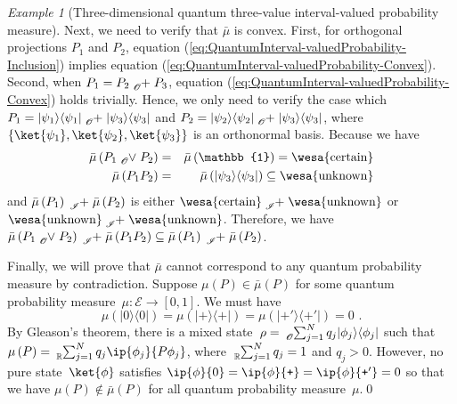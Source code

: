 \documentclass{article}
\theoremstyle{remark}
\newtheorem{example}{Example}
\newcommand{\events}{\ensuremath{\mathcal{E}}}
\newcommand{\proj}[1]{|#1 \rangle\langle #1 |}
\newcommand{\ps}{\texttt{+}}
\newcommand{\necess}{{\mbox{\wesa{certain}}}}
\newcommand{\unknown}{{\mbox{\wesa{unknown}}}}
\begin{document}
\begin{example}[Three-dimensional quantum three-value interval-valued
probability measure]
Next, we need to verify that $\bar{\mu}$ is convex. First, for orthogonal
projections $P_{1}$ and $P_{2}$, equation (\ref{eq:QuantumInterval-valuedProbability-Inclusion})
implies equation (\ref{eq:QuantumInterval-valuedProbability-Convex}).
Second, when $P_{1}=P_{2}\tensor*[_{\mathscr{O}}]{+}{}P_{3}$, equation
(\ref{eq:QuantumInterval-valuedProbability-Convex}) holds trivially.
Hence, we only need to verify the case which $P_{1}=\proj{\psi_{1}}\tensor*[_{\mathscr{O}}]{+}{}\proj{\psi_{3}}$
and $P_{2}=\proj{\psi_{2}}\tensor*[_{\mathscr{O}}]{+}{}\proj{\psi_{3}}$,
where $\left\{ \ket{\psi_{1}},\ket{\psi_{2}},\ket{\psi_{3}}\right\} $
is an orthonormal basis. Because we have 
\begin{eqnarray*}
\bar{\mu}\left(P_{1}\tensor*[_{\mathscr{O}}]{\vee}{}P_{2}\right) & = & \bar{\mu}\left(\mathbb{1}\right)=\necess\\
\bar{\mu}\left(P_{1}P_{2}\right) & = & \bar{\mu}\left(\proj{\psi_{3}}\right)\subseteq\unknown
\end{eqnarray*}
and $\bar{\mu}\left(P_{1}\right)\tensor*[_{\mathscr{I}}]{+}{}\bar{\mu}\left(P_{2}\right)$
is either $\necess\tensor*[_{\mathscr{I}}]{+}{}\unknown$ or $\unknown\tensor*[_{\mathscr{I}}]{+}{}\unknown$.
Therefore, we have $\bar{\mu}\left(P_{1}\tensor*[_{\mathscr{O}}]{\vee}{}P_{2}\right)\tensor*[_{\mathscr{I}}]{+}{}\bar{\mu}\left(P_{1}P_{2}\right)\subseteq\bar{\mu}\left(P_{1}\right)\tensor*[_{\mathscr{I}}]{+}{}\bar{\mu}\left(P_{2}\right)$.

Finally, we will prove that $\bar{\mu}$ cannot correspond to any
quantum probability measure by contradiction. Suppose $\mu(P)\in\bar{\mu}(P)$
for some quantum probability measure~$\mu:\events\rightarrow\left[0,1\right]$.
We must have 
\begin{equation}
\mu(\proj{0})=\mu(\proj{\ps})=\mu(\proj{\ps'})=0\textrm{ .}\label{eq:probability-zero-on-states}
\end{equation}
By Gleason's theorem, there is a mixed state~$\rho=\tensor*[_{\mathscr{O}}]{\sum}{_{j=1}^{N}}q_{j}\proj{\phi_{j}}$
such that $\mu\left(P\right)=\tensor*[_{\mathbb{R}}]{\sum}{_{j=1}^{N}}q_{j}\ip{\phi_{j}}{P\phi_{j}}$,
where $\tensor*[_{\mathbb{R}}]{\sum}{_{j=1}^{N}}q_{j}=1$ and $q_{j}>0$.
However, no pure state~$\ket{\phi}$ satisfies $\ip{\phi}{0}=\ip{\phi}{\ps}=\ip{\phi}{\ps'}=0$
so that we have $\mu(P)\notin\bar{\mu}(P)$ for all quantum probability
measure~$\mu$.\qed\end{example}

\end{document}
